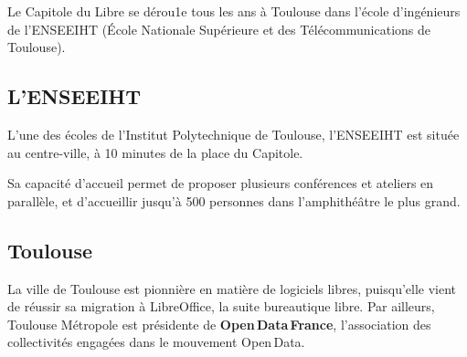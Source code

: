 
Le Capitole du Libre se dérou1e tous les ans à Toulouse dans l'école
 d'ingénieurs de l'ENSEEIHT (École Nationale Supérieure
 et des Télécommunications de Toulouse). 

\subsection{L'ENSEEIHT}

L'une des écoles de l'Institut Polytechnique de Toulouse, l'ENSEEIHT
 est située au centre-ville, à 10 minutes de la place du Capitole.

Sa capacité d'accueil permet de proposer plusieurs conférences et
 ateliers en parallèle, et d'accueillir jusqu'à 500 personnes dans
 l'amphithéâtre le plus grand.

\subsection{Toulouse}

La ville de Toulouse est pionnière en matière de logiciels libres,
 puisqu'elle vient de réussir sa migration à LibreOffice, la suite
 bureautique libre. Par ailleurs, Toulouse Métropole est présidente de
 \textbf{Open\,Data\,France}, l'association des collectivités
 engagées dans le mouvement Open\,Data.

